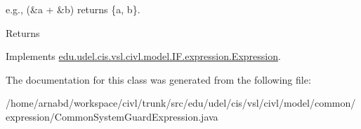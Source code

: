 e.\+g., {\ttfamily (\&a + \&b)} returns {\ttfamily \{a, b\}}.

\begin{DoxyReturn}{Returns}

\end{DoxyReturn}


Implements \hyperlink{interfaceedu_1_1udel_1_1cis_1_1vsl_1_1civl_1_1model_1_1IF_1_1expression_1_1Expression_ac2ad0236534bec54b91ee78ff658cbe0}{edu.\+udel.\+cis.\+vsl.\+civl.\+model.\+I\+F.\+expression.\+Expression}.



The documentation for this class was generated from the following file\+:\begin{DoxyCompactItemize}
\item 
/home/arnabd/workspace/civl/trunk/src/edu/udel/cis/vsl/civl/model/common/expression/Common\+System\+Guard\+Expression.\+java\end{DoxyCompactItemize}
